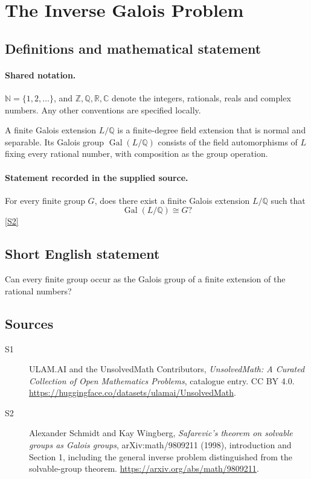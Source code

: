 \documentclass[11pt]{article}
\newcommand{\sref}[2]{\hyperlink{source:#1:#2}{[S#2]}}
\begin{document}
\section{The Inverse Galois Problem}\label{statement}

\subsection{Definitions and mathematical statement}

\paragraph{Shared notation.}$\mathbb N=\{1,2,\ldots\}$, and $\mathbb Z,\mathbb Q,\mathbb R,\mathbb C$ denote the integers, rationals, reals and complex numbers. Any other conventions are specified locally.


A finite Galois extension \(L/\mathbb Q\) is a finite-degree field
extension that is normal and separable.  Its Galois group
\(\operatorname{Gal}(L/\mathbb Q)\) consists of the field automorphisms
of \(L\) fixing every rational number, with composition as the group
operation.
\paragraph{Statement recorded in the supplied source.}
For every finite group \(G\), does there exist a finite Galois
extension \(L/\mathbb Q\) such that
\[
 \operatorname{Gal}(L/\mathbb Q)\cong G?
\] \sref{statement}{2}
\subsection{Short English statement}
Can every finite group occur as the Galois group of a finite extension of the rational numbers?
\subsection{Sources}
\begin{description}
\item[\hypertarget{source:statement:1}{S1}] ULAM.AI and the UnsolvedMath Contributors, \emph{UnsolvedMath: A Curated Collection of Open Mathematics Problems}, catalogue entry. CC BY 4.0. \url{https://huggingface.co/datasets/ulamai/UnsolvedMath}.
\item[\hypertarget{source:statement:2}{S2}] Alexander Schmidt and Kay Wingberg, \emph{Safarevic's theorem on solvable groups as Galois groups}, arXiv:math/9809211 (1998), introduction and Section 1, including the general inverse problem distinguished from the solvable-group theorem. \url{https://arxiv.org/abs/math/9809211}.
\end{description}
\label{end:statement}
\end{document}
